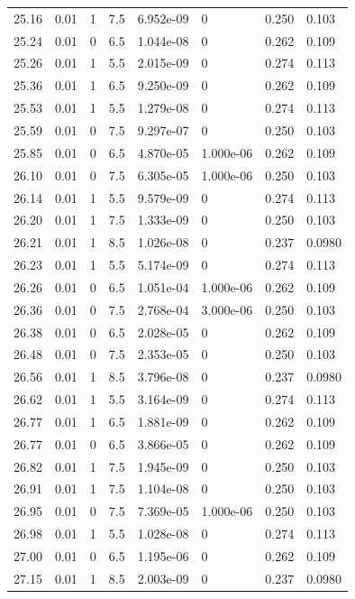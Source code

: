\documentclass[preview]{standalone}
\begin{document}
{{{{{{{{\begin{tabular}{L{1.2cm}C{1.2cm} C{0.3cm}C{0.5cm} C{1.4cm}C{1.4cm} C{1.4cm}C{1.4cm}}
  25.16  &  0.01  & 1     & 7.5 &  6.952e-09  & 0  & 0.250 &  0.103   \\ 
  25.24  &  0.01  & 0     & 6.5 &  1.044e-08  & 0  & 0.262 &  0.109   \\ 
  25.26  &  0.01  & 1     & 5.5 &  2.015e-09  & 0  & 0.274 &  0.113   \\ 
  25.36  &  0.01  & 1     & 6.5 &  9.250e-09  & 0  & 0.262 &  0.109   \\ 
  25.53  &  0.01  & 1     & 5.5 &  1.279e-08  & 0  & 0.274 &  0.113   \\ 
  25.59  &  0.01  & 0     & 7.5 &  9.297e-07  & 0  & 0.250 &  0.103   \\ 
  25.85  &  0.01  & 0     & 6.5 &  4.870e-05  & 1.000e-06  & 0.262 &  0.109   \\ 
  26.10  &  0.01  & 0     & 7.5 &  6.305e-05  & 1.000e-06  & 0.250 &  0.103   \\ 
  26.14  &  0.01  & 1     & 5.5 &  9.579e-09  & 0  & 0.274 &  0.113   \\ 
  26.20  &  0.01  & 1     & 7.5 &  1.333e-09  & 0  & 0.250 &  0.103   \\ 
  26.21  &  0.01  & 1     & 8.5 &  1.026e-08  & 0  & 0.237 &  0.0980   \\ 
  26.23  &  0.01  & 1     & 5.5 &  5.174e-09  & 0  & 0.274 &  0.113   \\ 
  26.26  &  0.01  & 0     & 6.5 &  1.051e-04  & 1.000e-06  & 0.262 &  0.109   \\ 
  26.36  &  0.01  & 0     & 7.5 &  2.768e-04  & 3.000e-06  & 0.250 &  0.103   \\ 
  26.38  &  0.01  & 0     & 6.5 &  2.028e-05  & 0  & 0.262 &  0.109   \\ 
  26.48  &  0.01  & 0     & 7.5 &  2.353e-05  & 0  & 0.250 &  0.103   \\ 
  26.56  &  0.01  & 1     & 8.5 &  3.796e-08  & 0  & 0.237 &  0.0980   \\ 
  26.62  &  0.01  & 1     & 5.5 &  3.164e-09  & 0  & 0.274 &  0.113   \\ 
  26.77  &  0.01  & 1     & 6.5 &  1.881e-09  & 0  & 0.262 &  0.109   \\ 
  26.77  &  0.01  & 0     & 6.5 &  3.866e-05  & 0  & 0.262 &  0.109   \\ 
  26.82  &  0.01  & 1     & 7.5 &  1.945e-09  & 0  & 0.250 &  0.103   \\ 
  26.91  &  0.01  & 1     & 7.5 &  1.104e-08  & 0  & 0.250 &  0.103   \\ 
  26.95  &  0.01  & 0     & 7.5 &  7.369e-05  & 1.000e-06  & 0.250 &  0.103   \\ 
  26.98  &  0.01  & 1     & 5.5 &  1.028e-08  & 0  & 0.274 &  0.113   \\ 
  27.00  &  0.01  & 0     & 6.5 &  1.195e-06  & 0  & 0.262 &  0.109   \\ 
  27.15  &  0.01  & 1     & 8.5 &  2.003e-09  & 0  & 0.237 &  0.0980   \\ 
\hline 
\end{tabular} 

}}}}}}}}
\end{document}
